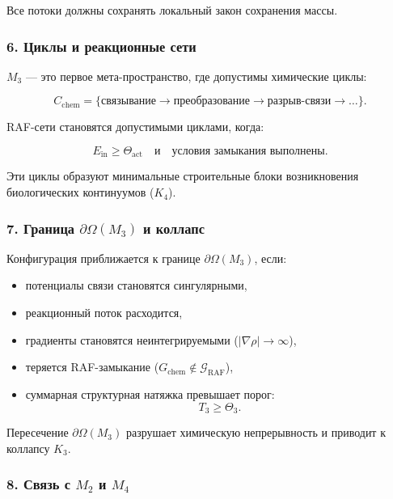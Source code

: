 Все потоки должны сохранять локальный закон сохранения массы.

\subsubsection*{6. Циклы и реакционные сети}

$M_3$ — это первое мета-пространство, где допустимы химические циклы:

\[
C_{\mathrm{chem}}
=
\big\{
\text{связывание} \to
\text{преобразование} \to
\text{разрыв-связи}
\to \dots
\big\}.
\]

RAF-сети становятся допустимыми циклами, когда:

\[
E_{\mathrm{in}} \ge \Theta_{\mathrm{act}}
\quad\text{и}\quad
\text{условия замыкания выполнены}.
\]

Эти циклы образуют минимальные строительные блоки возникновения
биологических континуумов ($K_4$).

\subsubsection*{7. Граница \texorpdfstring{$\partial\Omega(M_3)$}{\partial\Omega(M_3)} и коллапс}

Конфигурация приближается к границе $\partial\Omega(M_3)$, если:

\begin{itemize}
    \item потенциалы связи становятся сингулярными,
    \item реакционный поток расходится,
    \item градиенты становятся неинтегрируемыми ($|\nabla\rho| \to \infty$),
    \item теряется RAF-замыкание ($G_{\mathrm{chem}} \notin \mathcal{G}_{\mathrm{RAF}}$),
    \item суммарная структурная натяжка превышает порог:
    \[
    T_3 \ge \Theta_3.
    \]
\end{itemize}

Пересечение $\partial\Omega(M_3)$ разрушает химическую непрерывность и
приводит к коллапсу $K_3$.

\subsubsection*{8. Связь с \texorpdfstring{$M_2$}{M_2} и \texorpdfstring{$M_4$}{M_4}}

